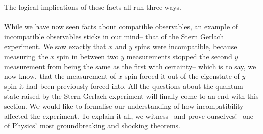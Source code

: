 The logical implications of these facts all run three ways.
\\\\
While we have now seen facts about compatible observables, an example of incompatible observables sticks in our mind-- that of the Stern Gerlach experiment. We saw exactly that $x$ and $y$ spins were incompatible, because measuring the $x$ spin in between two $y$ measurements stopped the second $y$ measurement from being the same as the first with certainty-- which is to say, we now know, that the measurement of $x$ spin forced it out of the eigenstate of $y$ spin it had been previously forced into. All the questions about the quantum state raised by the Stern Gerlach experiment will finally come to an end with this section. We would like to formalise our understanding of how incompatibility affected the experiment. To explain it all, we witness-- and prove ourselves!-- one of Physics' most groundbreaking and shocking theorems.
